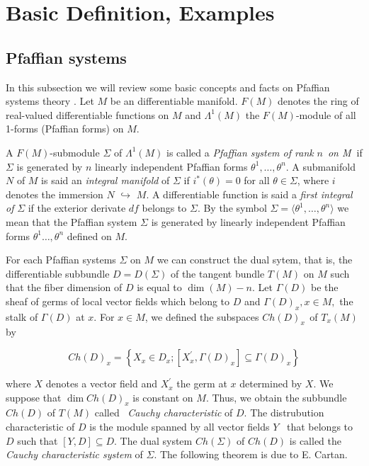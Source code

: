 \documentclass{amsproc}
\theoremstyle{remark}
\numberwithin{equation}{section}
\begin{document}
\section{Basic Definition, Examples}

\subsection{\textbf{Pfaffian systems}}

In this subsection we will review some basic concepts and facts on Pfaffian
systems theory \cite{BCGGG}. Let $M$ be an differentiable manifold. $F(M)$
denotes the ring of real-valued differentiable functions on $M$ and 
${ \Lambda }^{1}(M)$ the $F(M)$-module of all 1-forms (Pfaffian forms) on $M$. \ 

A $F(M)$-submodule $\Sigma$ of ${\Lambda }^{1}(M)$ is called a 
\textit{Pfaffian system of rank }$n$\textit{\ on M}\textbf{\ }if $\Sigma $
is generated by $n$ linearly independent Pfaffian forms $\theta ^{1},\ldots
,\theta ^{n}$. A submanifold $N$ of $M$ is said an \textit{integral manifold 
}of $\Sigma $ if $i^{\ast }(\theta )=0$ for all $\theta \in \Sigma $, where $i$ denotes the immersion $N$ $\hookrightarrow $ $M$. A differentiable
function is said a \textit{first integral of }$\Sigma $ if the exterior
derivate $df$ belongs to $\Sigma .$ By the symbol $\Sigma =\langle \theta
^{1},\ldots ,\theta ^{n}\rangle $ we mean that the Pfaffian system $\Sigma $
is generated by linearly independent Pfaffian forms $\theta ^{1}\ldots
,\theta ^{n}$ defined on $M$.

For each Pfaffian systems $\Sigma$ on $M$ we can construct the dual sytem,
that is, the differentiable subbundle $D=D(\Sigma )$ of the tangent bundle $T(M)$ on $M$ such that the fiber dimension of $D$ is equal to $\dim (M)-n$.
Let $\Gamma (D)$ be the sheaf of germs of local vector fields which belong
to $D$ and $\Gamma (D)_{x},x\in M,$ the stalk of $\Gamma (D)$ at $x$. For $x\in M$, we defined the subspaces $Ch(D)_{x\text{ }}$of $T_{x}(M)$ by

\begin{equation*}
Ch(D)_{x}=\left\{ X_{x}\in D_{x};\left[ X_{x}^{\prime },\Gamma (D)_{x}\right]
\subseteq \Gamma (D)_{x}\right\}
\end{equation*}

where $X$ denotes a vector field and $X_{x}^{\prime }$ the germ at $x$
determined by $X$. We suppose that $\dim Ch(D)_{x}$ is constant on $M$.
Thus, we obtain the subbundle\ $Ch(D)$ of $T(M)$ called \ \textit{Cauchy
characteristic} of $D$. The distrubution characteristic of $D$ is the module
spanned by all vector fields $Y$ \ that belongs to $D$ such that $\left[ Y,D\right] \subseteq D$. The dual system $Ch(\Sigma )$ of $Ch(D)$ is called the 
\textit{Cauchy characteristic system} of $\Sigma$. The following theorem is
due to E. Cartan. \ 
\end{document}

